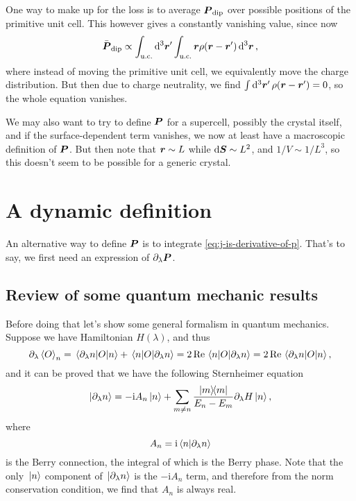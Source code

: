 \documentclass[hyperref, a4paper]{article}
\newcommand*{\ii}{\mathrm{i}}
\begin{document}
One way to make up for the loss is to average $\vb*{P}_{\text{dip}}$ 
over possible positions of the primitive unit cell.
This however gives a constantly vanishing value, 
since now 
\[
    \bar{\vb*{P}}_{\text{dip}} 
    \propto \int_{\text{u.c.}} \dd[3]{\vb*{r}'} \int_{\text{u.c.}} \vb*{r} \rho(\vb*{r} - \vb*{r}') \dd[3]{\vb*{r}}  ,
\]
where instead of moving the primitive unit cell,
we equivalently move the charge distribution.
But then due to charge neutrality, 
we find $\int \dd[3]{\vb*{r}'} \rho(\vb*{r} - \vb*{r}') = 0$,
so the whole equation vanishes. 

We may also want to try to define $\vb*{P}$ for a supercell, 
possibly the crystal itself,
and if the surface-dependent term vanishes, 
we now at least have a macroscopic definition of $\vb*{P}$.
But then note that $\vb*{r} \sim L$ 
while $\dd{\vb*{S}} \sim L^2$,
and $1 / V \sim 1 / L^3$,
so this doesn't seem to be possible for a generic crystal.

\section{A dynamic definition} 

An alternative way to define $\vb*{P}$
is to integrate \eqref{eq:j-is-derivative-of-p}.
That's to say, we first need an expression of $\partial_\lambda \vb*{P}$.

\subsection{Review of some quantum mechanic results}

Before doing that let's show some general formalism in quantum mechanics. 
Suppose we have Hamiltonian $H(\lambda)$,
and thus 
\begin{equation}
    \partial_\lambda \expval{O}_n = 
    \mel{\partial_\lambda n}{O}{n} 
    + \mel{n}{O}{\partial_\lambda n}
    = 2 \Re \mel{n}{O}{\partial_\lambda n}
    = 2 \Re \mel{\partial_\lambda n}{O}{n},
\end{equation}
and it can be proved that we have the following Sternheimer equation
\begin{equation}
    \ket{\partial_\lambda n} = - \ii A_n \ket*{n} 
    + \sum_{m \neq n} \frac{\dyad{m}}{E_n - E_m} \partial_\lambda H \ket*{n},
    \label{eq:sternheimer}
\end{equation}
where 
\begin{equation}
    A_n = \ii \braket{n}{\partial_\lambda n}
    \label{eq:berry-phase}
\end{equation}
is the Berry connection, 
the integral of which is the Berry phase.
Note that the only $\ket*{n}$ component of $\ket*{\partial_\lambda n}$ 
is the $- \ii A_n$ term, 
and therefore from the norm conservation condition, 
we find that $A_n$ is always real. 
\end{document}
